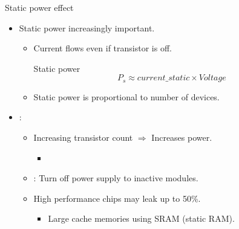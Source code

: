 \begin{frame}[t]{Static power effect}
\begin{itemize}
  \item Static power increasingly important.
    \begin{itemize}
      \item Current flows even if transistor is off.

\pause
\begin{block}{Static power}
\begin{displaymath}
P_s \approx current\_{static} \times Voltage
\end{displaymath}
\end{block}

      \pause
      \item Static power is proportional to number of devices.
    \end{itemize}

  \item {}:
    \begin{itemize}
      \item Increasing transistor count $\Rightarrow$ Increases power.
        \begin{itemize}
          \item {}
        \end{itemize}

      \pause
      \item {}: Turn off power supply to inactive modules.

      \pause
      \item High performance chips may leak up to 50\%.
        \begin{itemize}
          \item Large cache memories using SRAM (static RAM).
        \end{itemize}
    \end{itemize}
\end{itemize}
\end{frame}
